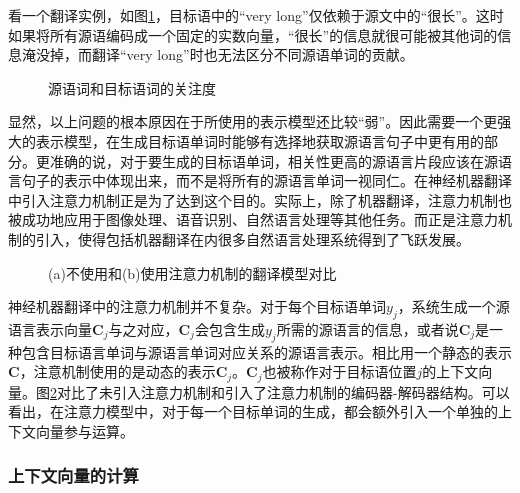 \parinterval 看一个翻译实例，如图\ref{fig:6-21}，目标语中的``very long''仅依赖于源文中的``很长''。这时如果将所有源语编码成一个固定的实数向量，``很长''的信息就很可能被其他词的信息淹没掉，而翻译``very long''时也无法区分不同源语单词的贡献。

\begin{figure}[htp]
\centering

\caption{源语词和目标语词的关注度}
\label{fig:6-21}
\end{figure}

\parinterval 显然，以上问题的根本原因在于所使用的表示模型还比较``弱''。因此需要一个更强大的表示模型，在生成目标语单词时能够有选择地获取源语言句子中更有用的部分。更准确的说，对于要生成的目标语单词，相关性更高的源语言片段应该在源语言句子的表示中体现出来，而不是将所有的源语言单词一视同仁。在神经机器翻译中引入注意力机制正是为了达到这个目的\cite{bahdanau2014neural,DBLP:journals/corr/LuongPM15}。实际上，除了机器翻译，注意力机制也被成功地应用于图像处理、语音识别、自然语言处理等其他任务。而正是注意力机制的引入，使得包括机器翻译在内很多自然语言处理系统得到了飞跃发展。

\begin{figure}[htp]
\centering

\caption{(a)不使用和(b)使用注意力机制的翻译模型对比}
\label{fig:6-22}
\end{figure}

\parinterval 神经机器翻译中的注意力机制并不复杂。对于每个目标语单词$y_j$，系统生成一个源语言表示向量$\mathbf{C}_j$与之对应，$\mathbf{C}_j$会包含生成$y_j$所需的源语言的信息，或者说$\mathbf{C}_j$是一种包含目标语言单词与源语言单词对应关系的源语言表示。相比用一个静态的表示$\mathbf{C}$，注意机制使用的是动态的表示$\mathbf{C}_j$。$\mathbf{C}_j$也被称作对于目标语位置$j$的上下文向量。图\ref{fig:6-22}对比了未引入注意力机制和引入了注意力机制的编码器-解码器结构。可以看出，在注意力模型中，对于每一个目标单词的生成，都会额外引入一个单独的上下文向量参与运算。


\subsubsection{上下文向量的计算}

